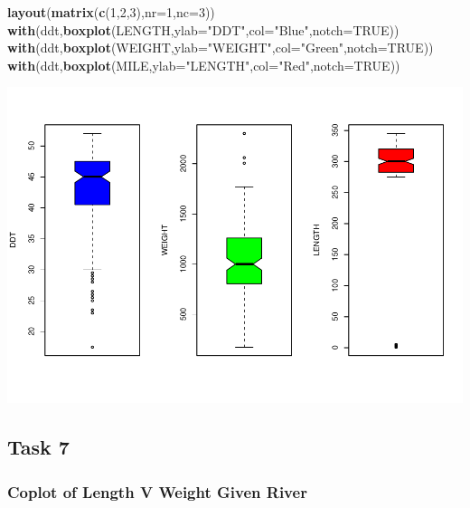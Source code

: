 \documentclass[]{article}
\newenvironment{Shaded}{\begin{snugshade}}{\end{snugshade}}
\newcommand{\KeywordTok}[1]{\textcolor[rgb]{0.13,0.29,0.53}{\textbf{#1}}}
\newcommand{\DataTypeTok}[1]{\textcolor[rgb]{0.13,0.29,0.53}{#1}}
\newcommand{\DecValTok}[1]{\textcolor[rgb]{0.00,0.00,0.81}{#1}}
\newcommand{\StringTok}[1]{\textcolor[rgb]{0.31,0.60,0.02}{#1}}
\newcommand{\OtherTok}[1]{\textcolor[rgb]{0.56,0.35,0.01}{#1}}
\newcommand{\NormalTok}[1]{#1}
\begin{document}
\begin{Shaded}
\begin{Highlighting}[]
\KeywordTok{layout}\NormalTok{(}\KeywordTok{matrix}\NormalTok{(}\KeywordTok{c}\NormalTok{(}\DecValTok{1}\NormalTok{,}\DecValTok{2}\NormalTok{,}\DecValTok{3}\NormalTok{),}\DataTypeTok{nr=}\DecValTok{1}\NormalTok{,}\DataTypeTok{nc=}\DecValTok{3}\NormalTok{))}
\KeywordTok{with}\NormalTok{(ddt,}\KeywordTok{boxplot}\NormalTok{(LENGTH,}\DataTypeTok{ylab=}\StringTok{"DDT"}\NormalTok{,}\DataTypeTok{col=}\StringTok{"Blue"}\NormalTok{,}\DataTypeTok{notch=}\OtherTok{TRUE}\NormalTok{))}
\KeywordTok{with}\NormalTok{(ddt,}\KeywordTok{boxplot}\NormalTok{(WEIGHT,}\DataTypeTok{ylab=}\StringTok{"WEIGHT"}\NormalTok{,}\DataTypeTok{col=}\StringTok{"Green"}\NormalTok{,}\DataTypeTok{notch=}\OtherTok{TRUE}\NormalTok{))}
\KeywordTok{with}\NormalTok{(ddt,}\KeywordTok{boxplot}\NormalTok{(MILE,}\DataTypeTok{ylab=}\StringTok{"LENGTH"}\NormalTok{,}\DataTypeTok{col=}\StringTok{"Red"}\NormalTok{,}\DataTypeTok{notch=}\OtherTok{TRUE}\NormalTok{))}
\end{Highlighting}
\end{Shaded}

\includegraphics{./tex2pdf.5760/c416e53f270300f96afdcfc3d677eeaa64b9cd2d.pdf}

\subsection{Task 7}\label{task-7}

\subsubsection{Coplot of Length V Weight Given
River}\label{coplot-of-length-v-weight-given-river}
\end{document}
